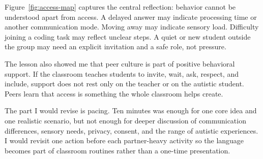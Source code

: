 Figure~\ref{fig:access-map} captures the central reflection: behavior cannot be understood apart from access. A delayed answer may indicate processing time or another communication mode. Moving away may indicate sensory load. Difficulty joining a coding task may reflect unclear steps. A quiet or new student outside the group may need an explicit invitation and a safe role, not pressure.

The lesson also showed me that peer culture is part of positive behavioral support. If the classroom teaches students to invite, wait, ask, respect, and include, support does not rest only on the teacher or on the autistic student. Peers learn that access is something the whole classroom helps create.

The part I would revise is pacing. Ten minutes was enough for one core idea and one realistic scenario, but not enough for deeper discussion of communication differences, sensory needs, privacy, consent, and the range of autistic experiences. I would revisit one action before each partner-heavy activity so the language becomes part of classroom routines rather than a one-time presentation.

